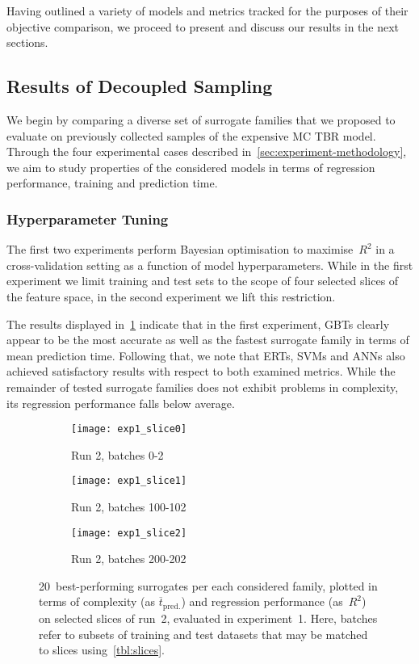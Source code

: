 Having outlined a variety of models and metrics tracked for the
purposes of their objective comparison, we proceed to present and discuss our
results in the next sections.


\subsection{Results of Decoupled Sampling}
\label{sec:modelres}

We begin by comparing a diverse set of surrogate families that we proposed
to evaluate on previously collected samples of the expensive MC TBR model.
Through the four experimental cases described
in~\cref{sec:experiment-methodology}, we aim to study properties of the
considered models in terms of regression performance, training and prediction
time.

\subsubsection{Hyperparameter Tuning}

The first two experiments perform Bayesian optimisation to maximise~$R^2$ in
a cross-validation setting as a function of model hyperparameters. While in the
first experiment we limit training and test sets to the scope of four selected
slices of the feature space, in the second experiment we lift this restriction.

The results displayed in~\cref{fig:exp1-time-vs-reg} indicate that in the first
experiment, GBTs clearly appear to be the most accurate as
well as the fastest surrogate family in terms of mean prediction time. Following
that, we note that ERTs, SVMs and ANNs also achieved satisfactory results with respect to both examined metrics.
While the remainder of tested surrogate families does not exhibit problems in
complexity, its regression performance falls below average.

\begin{figure}[h]
	\centering
	\begin{subfigure}[b]{0.333\textwidth}
		\centering
		\texttt{[image: exp1\_slice0]}
		\caption{Run 2, batches 0-2}
	\end{subfigure}\hfill%
	\begin{subfigure}[b]{0.333\textwidth}
		\centering
		\texttt{[image: exp1\_slice1]}
		\caption{Run 2, batches 100-102}
	\end{subfigure}\hfill%
	\begin{subfigure}[b]{0.333\textwidth}
		\centering
		\texttt{[image: exp1\_slice2]}
		\caption{Run 2, batches 200-202}
	\end{subfigure}
	\caption{20~best-performing surrogates per each considered family, plotted in
		terms of complexity (as $\overline{t}_{\text{pred.}}$) and regression
		performance (as~$R^2$) on selected slices of run~2, evaluated in
	experiment~1. Here, batches refer to subsets of training and test datasets that
	may be matched to slices using~\cref{tbl:slices}.}
	\label{fig:exp1-time-vs-reg}
\end{figure}

